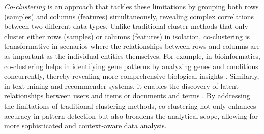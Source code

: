 \textit{Co-clustering}\cite{cheng2000BiclusteringExpressionData, kluger2003SpectralBiclusteringMicroarray, yan2017CoclusteringMultidimensionalBig} is an approach that tackles these limitations by grouping both rows (samples) and columns (features) simultaneously, revealing complex correlations between two different data types. Unlike traditional cluster methods \cite{zhang2023AdaptiveGraphConvolution, yuan2023JointNetworkTopology, wu2023EffectiveClusteringStructured} that only cluster either rows (samples) or columns (features) in isolation, co-clustering is transformative in scenarios where the relationships between rows and columns are as important as the individual entities themselves. For example, in bioinformatics, co-clustering helps in identifying gene patterns by analyzing genes and conditions concurrently, thereby revealing more comprehensive biological insights \cite{higham2007SpectralClusteringIts, kluger2003SpectralBiclusteringMicroarray, madeira2004BiclusteringAlgorithmsBiological, zhao2012BiclusteringAnalysisPattern, golchev2015BiclusteringAnalysisGene}. Similarly, in text mining and recommender systems, it enables the discovery of latent relationships between users and items or documents and terms \cite{busygin2008BiclusteringDataMining, dhillon2001CoclusteringDocumentsWords, dhillon2007WeightedGraphCuts, chen2023ParallelNonNegativeMatrix, bouchareb2019ModelBasedCoclustering}. By addressing the limitations of traditional clustering methods, co-clustering not only enhances accuracy in pattern detection but also broadens the analytical scope, allowing for more sophisticated and context-aware data analysis.

